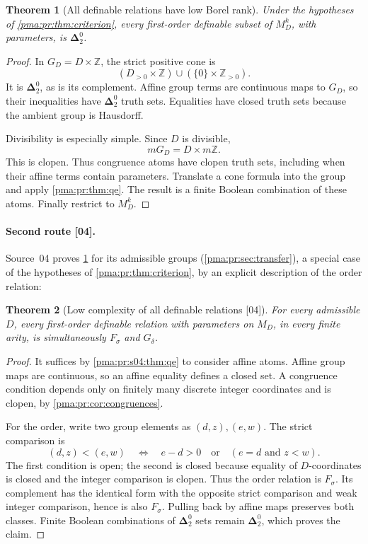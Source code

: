 \documentclass[11pt]{article}
\numberwithin{equation}{section}
\newtheorem{theorem}{Theorem}[section]
\theoremstyle{definition}
\theoremstyle{remark}
\newcommand{\Z}{\mathbb Z}
\newcommand{\GD}{G_D}
\newcommand{\MD}{M_D}
\newcommand{\Dtwo}{\boldsymbol{\Delta}^{0}_{2}}
\newcommand{\src}[1]{\textup{\textsf{\small[#1]}}}
\begin{document}
\begin{theorem}[All definable relations have low Borel rank]
\label{pma:pr:thm:definableborel}
Under the hypotheses of \cref{pma:pr:thm:criterion}, every first-order definable
subset of $\MD^k$, with parameters, is $\Dtwo$.
\end{theorem}
\begin{proof}
In $\GD=D\times\Z$, the strict positive cone is
\[
 (D_{>0}\times\Z)\cup(\{0\}\times\Z_{>0}).
\]
It is $\Dtwo$, as is its complement. Affine group terms are continuous
maps to $\GD$, so their inequalities have $\Dtwo$ truth sets. Equalities
have closed truth sets because the ambient group is Hausdorff.

Divisibility is especially simple. Since $D$ is divisible,
\begin{equation}
 m\GD=D\times m\Z.
 \label{pma:pr:eq:modslice}
\end{equation}
This is clopen. Thus congruence atoms have clopen truth sets, including
when their affine terms contain parameters. Translate a cone formula
into the group and apply \cref{pma:pr:thm:qe}. The result is a finite Boolean
combination of these atoms. Finally restrict to $\MD^k$.
\end{proof}

\paragraph{Second route \src{04}.} Source~04 proves \cref{pma:pr:thm:definableborel}
for its admissible groups (\cref{pma:pr:sec:transfer}), a special case of the
hypotheses of \cref{pma:pr:thm:criterion}, by an explicit description of the
order relation:

\begin{theorem}[Low complexity of all definable relations \src{04}]\label{pma:pr:thm:delta2}
For every admissible $D$, every first-order definable relation with
parameters on $M_D$, in every finite arity, is simultaneously $F_\sigma$
and $G_\delta$.
\end{theorem}

\begin{proof}
It suffices by \cref{pma:pr:s04:thm:qe} to consider affine atoms. Affine group maps
are continuous, so an affine equality defines a closed set. A congruence
condition depends only on finitely many discrete integer coordinates and
is clopen, by \cref{pma:pr:cor:congruences}.

For the order, write two group elements as $(d,z),(e,w)$. The strict
comparison is
\begin{equation}\label{pma:pr:eq:ordertopology}
 (d,z)<(e,w)
 \quad\Longleftrightarrow\quad
 e-d>0\quad\text{or}\quad (e=d\text{ and }z<w).
\end{equation}
The first condition is open; the second is closed because equality of
$D$-coordinates is closed and the integer comparison is clopen. Thus the
order relation is $F_\sigma$. Its complement has the identical form with
the opposite strict comparison and weak integer comparison, hence is
also $F_\sigma$. Pulling back by affine maps preserves both classes.
Finite Boolean combinations of $\boldsymbol\Delta^0_2$ sets remain
$\boldsymbol\Delta^0_2$, which proves the claim.
\end{proof}
\end{document}
